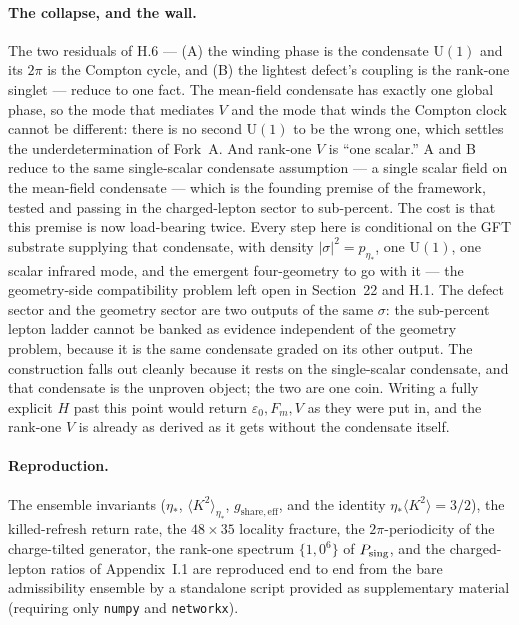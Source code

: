 \documentclass[11pt]{article}
\begin{document}
\paragraph{The collapse, and the wall.}
The two residuals of H.6 --- (A) the winding phase is the condensate $\mathrm{U}(1)$ and its $2\pi$ is the Compton cycle, and (B) the lightest defect's coupling is the rank-one singlet --- reduce to one fact. The mean-field condensate has exactly one global phase, so the mode that mediates $V$ and the mode that winds the Compton clock cannot be different: there is no second $\mathrm{U}(1)$ to be the wrong one, which settles the underdetermination of Fork~A. And rank-one $V$ is ``one scalar.'' A and B reduce to the same single-scalar condensate assumption --- a single scalar field on the mean-field condensate --- which is the founding premise of the framework, tested and passing in the charged-lepton sector to sub-percent. The cost is that this premise is now load-bearing twice. Every step here is conditional on the GFT substrate supplying that condensate, with density $|\sigma|^2=p_{\eta_*}$, one $\mathrm{U}(1)$, one scalar infrared mode, and the emergent four-geometry to go with it --- the geometry-side compatibility problem left open in Section~22 and H.1. The defect sector and the geometry sector are two outputs of the same $\sigma$: the sub-percent lepton ladder cannot be banked as evidence independent of the geometry problem, because it is the same condensate graded on its other output. The construction falls out cleanly because it rests on the single-scalar condensate, and that condensate is the unproven object; the two are one coin. Writing a fully explicit $H$ past this point would return $\varepsilon_0,F_m,V$ as they were put in, and the rank-one $V$ is already as derived as it gets without the condensate itself.


\paragraph{Reproduction.}
The ensemble invariants ($\eta_*$, $\langle K^2\rangle_{\eta_*}$, $g_{\mathrm{share,eff}}$, and the identity $\eta_*\langle K^2\rangle=3/2$), the killed-refresh return rate, the $48\times35$ locality fracture, the $2\pi$-periodicity of the charge-tilted generator, the rank-one spectrum $\{1,0^6\}$ of $P_{\rm sing}$, and the charged-lepton ratios of Appendix~I.1 are reproduced end to end from the bare admissibility ensemble by a standalone script provided as supplementary material (requiring only \texttt{numpy} and \texttt{networkx}).
\end{document}

